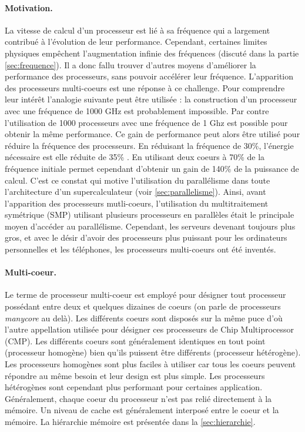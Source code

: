 \paragraph{Motivation.}
La vitesse de calcul d'un processeur est lié à sa fréquence qui a largement contribué à l'évolution de leur performance. Cependant, certaines limites physiques empêchent l'augmentation infinie des fréquences (discuté dans la partie \ref{sec:frequence}). Il a donc fallu trouver d'autres moyens d'améliorer la performance des processeurs, sans pouvoir accélérer leur fréquence. L'apparition des processeurs multi-coeurs est une réponse à ce challenge. Pour comprendre leur intérêt l'analogie suivante peut être utilisée \cite{tanenbaum2016structured}: la construction d'un processeur avec une fréquence de 1000 GHz est probablement impossible. Par contre l'utilisation de 1000 processeurs avec une fréquence de 1 Ghz est possible pour obtenir la même performance. Ce gain de performance peut alors être utilisé pour réduire la fréquence des processeurs. En réduisant la fréquence de 30\%, l'énergie nécessaire est elle réduite de 35\% \cite{mattsson2014haven}. En utilisant deux coeurs à 70\% de la fréquence initiale permet cependant d'obtenir un gain de 140\% de la puissance de calcul. C'est ce constat qui motive l'utilisation du parallélisme dans toute l'architecture d'un supercalculateur (voir \autoref{sec:parallelisme}). Ainsi, avant l'apparition des processeurs mutli-coeurs, l'utilisation du multitraitement symétrique (SMP) utilisant plusieurs processeurs en parallèles était le principale moyen d'accéder au parallélisme. Cependant, les serveurs devenant toujours plus gros, et avec le désir d'avoir des processeurs plus puissant pour les ordinateurs personnelles et les téléphones, les processeurs multi-coeurs ont été inventés.


\paragraph{Multi-coeur.}
Le terme de processeur multi-coeur est employé pour désigner tout processeur possédant entre deux et quelques dizaines de coeurs (on parle de processeurs \textit{manycore} au delà). Les différents coeurs sont disposés sur la même puce d'où l'autre appellation utilisée pour désigner ces processeurs de Chip Multiprocessor (CMP).
Les différents coeurs sont généralement identiques en tout point (processeur homogène) bien qu'ils puissent être différents (processeur hétérogène). Les processeurs homogènes sont plus faciles à utiliser car tous les coeurs peuvent répondre au même besoin et leur design est plus simple. Les processeurs hétérogènes sont cependant plus performant pour certaines application. 
Généralement, chaque coeur du processeur n'est pas relié directement à la mémoire. Un niveau de cache est généralement interposé entre le coeur et la mémoire. La hiérarchie mémoire est présentée dans la \autoref{sec:hierarchie}.

